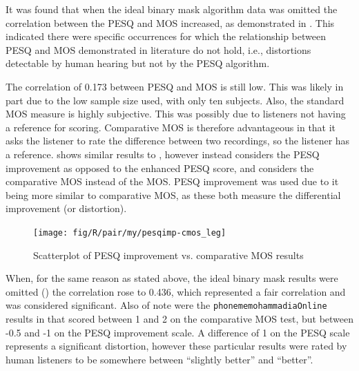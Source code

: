 It was found that when the ideal binary mask algorithm data was omitted
the correlation between the \ac{PESQ} and \ac{MOS} increased, as
demonstrated in . This indicated
there were specific occurrences for which the relationship between
\ac{PESQ} and \ac{MOS} demonstrated in literature do not hold, i.e.,
distortions detectable by human hearing but not by the \ac{PESQ}
algorithm.

The correlation of 0.173 between \ac{PESQ} and \ac{MOS} is still
low. This was likely in part due to the low sample size used, with
only ten subjects. Also, the standard \ac{MOS} measure is highly
subjective. This was possibly due to listeners not having a reference
for scoring. Comparative \ac{MOS} is therefore advantageous in that
it asks the listener to rate the difference between two recordings,
so the listener has a reference.  shows similar
results to , however instead considers the \ac{PESQ}
improvement as opposed to the enhanced \ac{PESQ} score, and considers
the comparative \ac{MOS} instead of the \ac{MOS}. \ac{PESQ} improvement
was used due to it being more similar to comparative \ac{MOS}, as
these both measure the differential improvement (or distortion).

\begin{figure}[h]

\texttt{[image: fig/R/pair/my/pesqimp-cmos\_leg]}

\protect\caption{\label{fig:my-pesqimp-cmos}Scatterplot of \acs{PESQ} improvement
vs. comparative \acs{MOS} results}
\end{figure}


When, for the same reason as stated above, the ideal binary mask results
were omitted () the correlation
rose to 0.436, which represented a fair correlation and was considered
significant. Also of note were the \lstinline!phonememohammadiaOnline!
results in  that scored between
1 and 2 on the comparative \ac{MOS} test, but between -0.5 and -1
on the \ac{PESQ} improvement scale. A difference of 1 on the \ac{PESQ}
scale represents a significant distortion, however these particular
results were rated by human listeners to be somewhere between ``slightly
better'' and ``better''.

